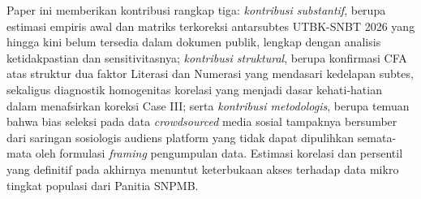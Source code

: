 Paper ini memberikan kontribusi rangkap tiga: \textit{kontribusi substantif}, berupa estimasi empiris awal dan matriks terkoreksi antarsubtes UTBK-SNBT 2026 yang hingga kini belum tersedia dalam dokumen publik, lengkap dengan analisis ketidakpastian dan sensitivitasnya; \textit{kontribusi struktural}, berupa konfirmasi CFA atas struktur dua faktor Literasi dan Numerasi yang mendasari kedelapan subtes, sekaligus diagnostik homogenitas korelasi yang menjadi dasar kehati-hatian dalam menafsirkan koreksi Case III; serta \textit{kontribusi metodologis}, berupa temuan bahwa bias seleksi pada data \textit{crowdsourced} media sosial tampaknya bersumber dari saringan sosiologis audiens platform yang tidak dapat dipulihkan semata-mata oleh formulasi \textit{framing} pengumpulan data. Estimasi korelasi dan persentil yang definitif pada akhirnya menuntut keterbukaan akses terhadap data mikro tingkat populasi dari Panitia SNPMB.